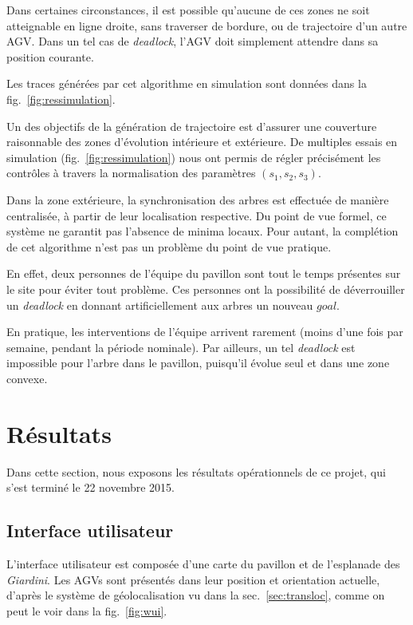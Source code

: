 \documentclass[french,A4paper,]{book}
\begin{document}
Dans certaines circonstances, il est possible qu'aucune de ces zones ne
soit atteignable en ligne droite, sans traverser de bordure, ou de
trajectoire d'un autre AGV. Dans un tel cas de \emph{deadlock}, l'AGV
doit simplement attendre dans sa position courante.

Les traces générées par cet algorithme en simulation sont données dans
la fig.~\ref{fig:ressimulation}.

Un des objectifs de la génération de trajectoire est d'assurer une
couverture raisonnable des zones d'évolution intérieure et extérieure.
De multiples essais en simulation (fig.~\ref{fig:ressimulation}) nous
ont permis de régler précisément les contrôles à travers la
normalisation des paramètres \((s_1, s_2, s_3)\).

Dans la zone extérieure, la synchronisation des arbres est effectuée de
manière centralisée, à partir de leur localisation respective. Du point
de vue formel, ce système ne garantit pas l'absence de minima locaux.
Pour autant, la complétion de cet algorithme n'est pas un problème du
point de vue pratique.

En effet, deux personnes de l'équipe du pavillon sont tout le temps
présentes sur le site pour éviter tout problème. Ces personnes ont la
possibilité de déverrouiller un \emph{deadlock} en donnant
artificiellement aux arbres un nouveau \(goal\).

En pratique, les interventions de l'équipe arrivent rarement (moins
d'une fois par semaine, pendant la période nominale). Par ailleurs, un
tel \emph{deadlock} est impossible pour l'arbre dans le pavillon,
puisqu'il évolue seul et dans une zone convexe.

\section{Résultats}\label{sec:transresults}

Dans cette section, nous exposons les résultats opérationnels de ce
projet, qui s'est terminé le 22 novembre 2015.

\subsection{Interface utilisateur}\label{interface-utilisateur}

L'interface utilisateur est composée d'une carte du pavillon et de
l'esplanade des \emph{Giardini}. Les AGVs sont présentés dans leur
position et orientation actuelle, d'après le système de géolocalisation
vu dans la sec.~\ref{sec:transloc}, comme on peut le voir dans la
fig.~\ref{fig:wui}.
\end{document}
